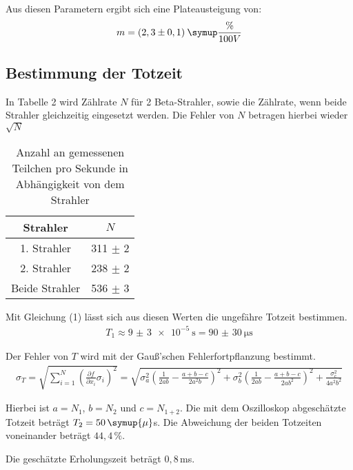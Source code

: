Aus diesen Parametern ergibt sich eine Plateausteigung von:
\begin{equation*}
  m = (2,3 \pm 0,1) \: \symup{\frac{\%}{100V}}
\end{equation*}




\subsection{Bestimmung der Totzeit}

In Tabelle 2 wird Zählrate $N$ für 2 Beta-Strahler, sowie die Zählrate, wenn beide Strahler gleichzeitig
eingesetzt werden. Die Fehler von $N$ betragen hierbei wieder $\sqrt{N}$

\begin{table}[H]
  \centering
  \caption{Anzahl an gemessenen Teilchen pro Sekunde in Abhängigkeit von dem Strahler}
  \label{tab:Rechteckspannung}
  \begin{tabular}{c c}
    \toprule
    Strahler & $N$  \\
    \midrule
    1. Strahler & 311 $\pm$ 2 \\
    2. Strahler & 238 $\pm$ 2\\
    Beide Strahler & 536 $\pm$ 3\\
    \bottomrule
  \end{tabular}
\end{table}

Mit Gleichung (1) lässt sich aus diesen Werten die ungefähre Totzeit bestimmen.
\begin{align*}
  T_1 \approx \SI{9(3)e-5}{\second} = \SI{90(30)}{\micro\second}
\end{align*}

Der Fehler von $T$ wird mit der Gauß'schen Fehlerfortpflanzung bestimmt.
\begin{align*}
  \sigma_T = \sqrt{
      \sum\limits_{i = 1}^N
       \left( \frac{\partial f}{\partial x_i} \sigma_i \right)^{\!\! 2}
     }
    = \sqrt{\sigma_{a}^{2} \left(\frac{1}{2 a b} - \frac{a + b - c}{2 a^{2} b}\right)^{2}
  + \sigma_{b}^{2} \left(\frac{1}{2 a b} - \frac{a + b - c}{2 a b^{2}}\right)^{2} + \frac{\sigma_{c}^{2}}{4 a^{2} b^{2}}}
\end{align*}

Hierbei ist $a=N_1$, $b=N_2$ und $c=N_{1+2}$.
Die mit dem Oszilloskop abgeschätzte Totzeit beträgt $T_2 = 50 \, \symup{\mu} $s.
Die Abweichung der beiden Totzeiten voneinander beträgt $44,4 \, \%$.

Die geschätzte Erholungszeit beträgt $0,8 \,$ms.


